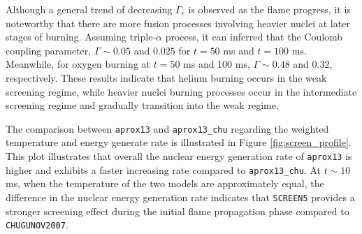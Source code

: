 \documentclass[preprint,times,tighten]{aastex631}
\begin{document}
Although a general trend of decreasing $\Gamma_e$ is observed as the flame progress, it is noteworthy that there are more fusion processes involving heavier nuclei at later stages of burning. Assuming triple-$\alpha$ process, it can inferred that the Coulomb coupling parameter, $\Gamma \sim 0.05$ and $0.025$ for $t = 50$ ms and $t = 100$ ms. Meanwhile, for oxygen burning at $t = 50$ ms and 100 ms, $\Gamma \sim 0.48$ and $0.32$, respectively. These results indicate that helium burning occurs in the weak screening regime, while heavier nuclei burning processes occur in the intermediate screening regime and gradually transition into the weak regime.




\begin{figure*}
\centering
{}
\caption{\label{fig:screen_profile} Time profiles showing the weighted temperature and energy generation rate of the burning front for {\tt aprox13} and {\tt aprox13\_chu}.}
\end{figure*}


The comparison between {\tt aprox13} and {\tt aprox13\_chu} regarding the weighted temperature and energy generate rate is illustrated in Figure \ref{fig:screen_profile}. This plot illustrates that overall the nuclear energy generation rate of {\tt aprox13} is higher and exhibits a faster increasing rate compared to {\tt aprox13\_chu}. At $t \sim 10$ ms, when the temperature of the two models are approximately equal, the difference in the nuclear energy generation rate indicates that {\tt SCREEN5} provides a stronger screening effect during the initial flame propagation phase compared to {\tt CHUGUNOV2007}.

\end{document}
